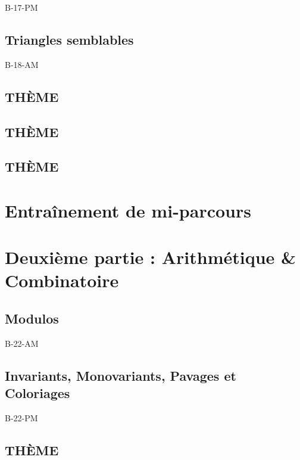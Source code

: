 \documentclass[poly,trombi]{valbonne}
\begin{document}
{B-17-PM}

\subsection{Triangles semblables}

{B-18-AM}

\subsection{THÈME}


\subsection{THÈME}


\subsection{THÈME}



\section{Entraînement de mi-parcours}



\section{Deuxième partie : Arithmétique \& Combinatoire}

\subsection{Modulos}
{B-22-AM}

\subsection{Invariants, Monovariants, Pavages et Coloriages}

{B-22-PM}

\subsection{THÈME}
\end{document}
